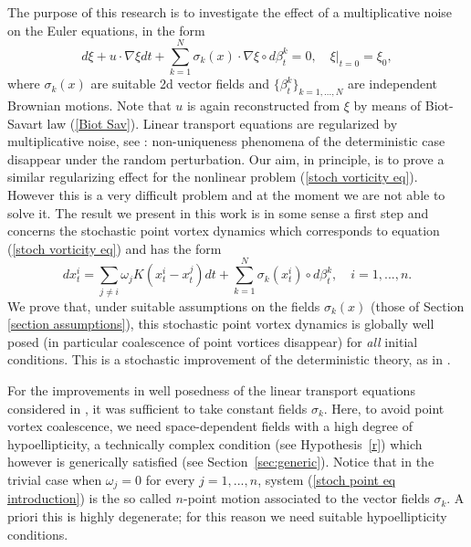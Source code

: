\documentclass[11pt,a4paper]{article}%
\begin{document}
The purpose of this research is to investigate the effect of a multiplicative
noise on the Euler equations, in the form
\begin{equation}
d\xi+u\cdot\nabla\xi dt+\sum_{k=1}^{N}\sigma_{k}( x) \cdot\nabla\xi\circ
d\beta_{t}^{k}=0,\quad\xi|_{t=0}=\xi_{0}, \label{stoch vorticity eq}%
\end{equation}
 where  $\sigma_{k}( x) $ are suitable  2d vector fields
and $\{ \beta^{k}_t\} _{k=1,...,N}$ are independent Brownian
motions. Note that   $u$ is again reconstructed from $\xi$ by
means of Biot-Savart law (\ref{Biot Sav}). Linear transport
equations are regularized by multiplicative noise, see
\cite{FlaGubPriola}: non-uniqueness phenomena of the deterministic
case disappear under the random perturbation. Our aim,  in
principle, is to prove a similar regularizing effect  for the
nonlinear problem (\ref{stoch vorticity eq}). However this is a very
difficult problem and at the moment we are not able to solve it. The
result we present in this work is in some sense a first  step and
concerns  the stochastic point vortex dynamics which corresponds to
equation (\ref{stoch vorticity eq}) and has the
form%
\begin{equation}
dx_{t}^{i}=\sum_{j\neq i}\omega_{j}K( x_{t}^{i}-x_{t}^{j}) dt+\sum_{k=1}%
^{N}\sigma_{k}( x_{t}^{i})\circ d\beta_{t}^{k},\quad i=1,...,n.
\label{stoch point eq introduction}%
\end{equation}
We prove that, under suitable assumptions on the fields
$\sigma_{k}( x) $ (those of Section \ref{section assumptions}), this
stochastic point vortex dynamics is globally well posed (in
particular coalescence of point vortices disappear) for \emph{all}
initial conditions. This is a stochastic improvement of the
deterministic theory, as in \cite{FlaGubPriola}.

For the improvements in well posedness of the linear transport equations
considered in \cite{FlaGubPriola}, it was sufficient to take constant fields
$\sigma_{k}$. Here, to avoid point vortex coalescence, we need
space-dependent  fields with a high degree of hypoellipticity, a technically
complex condition (see Hypothesis~\ref{r})  which however is generically
satisfied  (see Section~\ref{sec:generic}). Notice that in the trivial case when $\omega
_{j}=0$ for every $j=1,...,n$, system (\ref{stoch point eq introduction}) is
the so called $n$-point motion associated to the vector fields $\sigma_{k}$. A
priori this is highly degenerate; for this reason we need suitable
hypoellipticity conditions.
\end{document}
